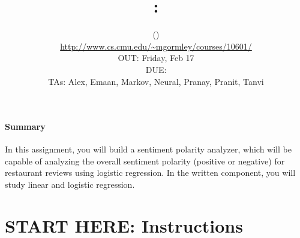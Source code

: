 \documentclass[11pt,addpoints,answers]{exam}
\title{\textsc{\hwNum}: \textsc{\hwTopic}
} %
\author{\courseNum \courseName (\courseSem)\\
\url{http://www.cs.cmu.edu/~mgormley/courses/10601/} \\
OUT: Friday, Feb 17 \\
DUE: \dueDate{} \\
TAs: Alex, Emaan, Markov, Neural, Pranay, Pranit, Tanvi
}
\date{}
\date{}
\begin{document}
\maketitle



\begin{notebox}
\paragraph{Summary} In this assignment, you will build a sentiment polarity analyzer, which will be capable of analyzing the overall sentiment polarity (positive or negative) for restaurant reviews using logistic regression. In the written component, you will study linear and logistic regression.
\end{notebox}
\newcommand \maxsubs {10 }
\section*{START HERE: Instructions}
\end{document}
